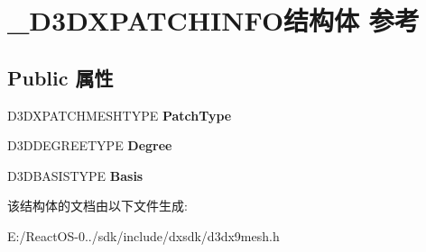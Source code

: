 \hypertarget{struct___d3_d_x_p_a_t_c_h_i_n_f_o}{}\section{\+\_\+\+D3\+D\+X\+P\+A\+T\+C\+H\+I\+N\+F\+O结构体 参考}
\label{struct___d3_d_x_p_a_t_c_h_i_n_f_o}
\subsection*{Public 属性}
\begin{DoxyCompactItemize}
\item 
\mbox{\label{struct___d3_d_x_p_a_t_c_h_i_n_f_o_aa4ddfb29fd3398839a9be753f28bc238}} 
D3\+D\+X\+P\+A\+T\+C\+H\+M\+E\+S\+H\+T\+Y\+PE {\bfseries Patch\+Type}
\item 
\mbox{\label{struct___d3_d_x_p_a_t_c_h_i_n_f_o_a878a2ab86767708a6d47b6e44851523f}} 
D3\+D\+D\+E\+G\+R\+E\+E\+T\+Y\+PE {\bfseries Degree}
\item 
\mbox{\label{struct___d3_d_x_p_a_t_c_h_i_n_f_o_afd3a568e3ed571c19143247181fe1981}} 
D3\+D\+B\+A\+S\+I\+S\+T\+Y\+PE {\bfseries Basis}
\end{DoxyCompactItemize}


该结构体的文档由以下文件生成\+:\begin{DoxyCompactItemize}
\item 
E\+:/\+React\+O\+S-\/0../sdk/include/dxsdk/d3dx9mesh.\+h\end{DoxyCompactItemize}
